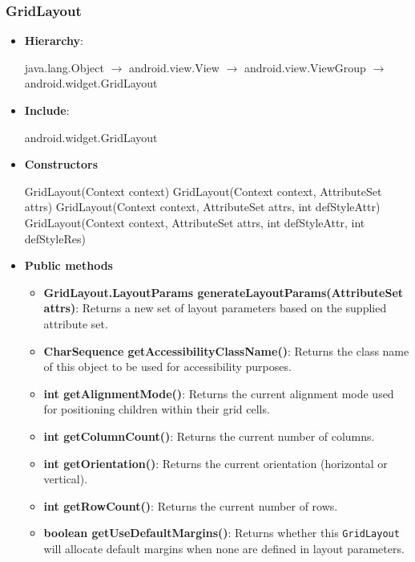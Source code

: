 \documentclass{report}
\begin{document}
    \pagebreak 
    \subsubsection{GridLayout}
    \begin{itemize}
        \item \textbf{Hierarchy}: 
            \begin{center}
                java.lang.Object $\to$	android.view.View $\to$	android.view.ViewGroup $\to$	android.widget.GridLayout
            \end{center}
        \item \textbf{Include}:
            \bigbreak \noindent 
            \begin{javacode}
            android.widget.GridLayout
            \end{javacode}
        \item \textbf{Constructors}
            \bigbreak \noindent 
            \begin{javacode}
                GridLayout(Context context)
                GridLayout(Context context, AttributeSet attrs)
                GridLayout(Context context, AttributeSet attrs, int defStyleAttr)
                GridLayout(Context context, AttributeSet attrs, int defStyleAttr, int defStyleRes)
            \end{javacode}
        \item \textbf{Public methods}
            \begin{itemize}
                \item \textbf{GridLayout.LayoutParams generateLayoutParams(AttributeSet attrs)}: Returns a new set of layout parameters based on the supplied attribute set.
                \item \textbf{CharSequence getAccessibilityClassName()}: Returns the class name of this object to be used for accessibility purposes.
                \item \textbf{int getAlignmentMode()}: Returns the current alignment mode used for positioning children within their grid cells.
                \item \textbf{int getColumnCount()}: Returns the current number of columns.
                \item \textbf{int getOrientation()}: Returns the current orientation (horizontal or vertical).
                \item \textbf{int getRowCount()}: Returns the current number of rows.
                \item \textbf{boolean getUseDefaultMargins()}: Returns whether this \texttt{GridLayout} will allocate default margins when none are defined in layout parameters.

\end{itemize}
\end{itemize}
\end{document}
